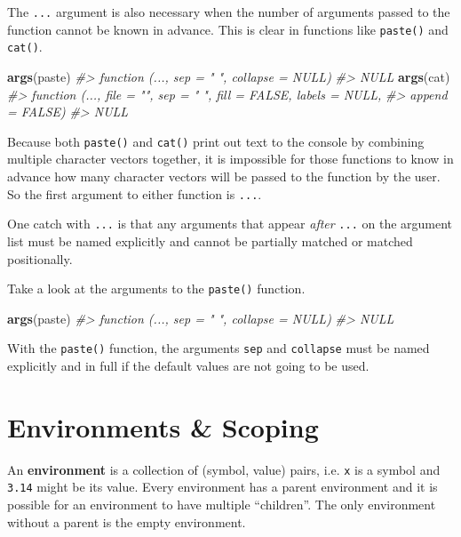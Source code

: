 \documentclass[]{book}
\newenvironment{Shaded}{\begin{snugshade}}{\end{snugshade}}
\newcommand{\KeywordTok}[1]{\textcolor[rgb]{0.13,0.29,0.53}{\textbf{#1}}}
\newcommand{\CommentTok}[1]{\textcolor[rgb]{0.56,0.35,0.01}{\textit{#1}}}
\newcommand{\NormalTok}[1]{#1}
\theoremstyle{definition}
\theoremstyle{definition}
\theoremstyle{definition}
\theoremstyle{remark}
\begin{document}
The \texttt{...} argument is also necessary when the number of arguments
passed to the function cannot be known in advance. This is clear in
functions like \texttt{paste()} and \texttt{cat()}.

\begin{Shaded}
\begin{Highlighting}[]
\KeywordTok{args}\NormalTok{(paste)}
\CommentTok{#> function (..., sep = " ", collapse = NULL) }
\CommentTok{#> NULL}
\KeywordTok{args}\NormalTok{(cat)}
\CommentTok{#> function (..., file = "", sep = " ", fill = FALSE, labels = NULL, }
\CommentTok{#>     append = FALSE) }
\CommentTok{#> NULL}
\end{Highlighting}
\end{Shaded}

Because both \texttt{paste()} and \texttt{cat()} print out text to the
console by combining multiple character vectors together, it is
impossible for those functions to know in advance how many character
vectors will be passed to the function by the user. So the first
argument to either function is \texttt{...}.

One catch with \texttt{...} is that any arguments that appear
\emph{after} \texttt{...} on the argument list must be named explicitly
and cannot be partially matched or matched positionally.

Take a look at the arguments to the \texttt{paste()} function.

\begin{Shaded}
\begin{Highlighting}[]
\KeywordTok{args}\NormalTok{(paste)}
\CommentTok{#> function (..., sep = " ", collapse = NULL) }
\CommentTok{#> NULL}
\end{Highlighting}
\end{Shaded}

With the \texttt{paste()} function, the arguments \texttt{sep} and
\texttt{collapse} must be named explicitly and in full if the default
values are not going to be used.

\section{Environments \& Scoping}\label{environments-scoping}

An \textbf{environment} is a collection of (symbol, value) pairs, i.e.
\texttt{x} is a symbol and \texttt{3.14} might be its value. Every
environment has a parent environment and it is possible for an
environment to have multiple ``children''. The only environment without
a parent is the empty environment.
\end{document}
